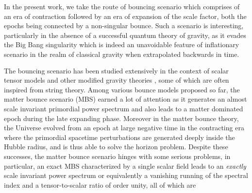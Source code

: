 \documentclass{article}
\begin{document}
In the present work, we take the route of bouncing scenario which comprises of an era of contraction 
followed by an era of expansion of the scale factor, both the epochs being connected by a non-singular bounce. Such a scenario is 
interesting, particularly in the absence of a successful quantum theory of gravity, as it evades the Big Bang singularity which is indeed an 
unavoidable feature of inflationary scenario in the realm of 
classical gravity when extrapolated backwards in time. 

The bouncing scenario has been studied extensively in the context of scalar tensor models and other modified gravity theories 
\cite{Brandenberger:2012zb,Brandenberger:2016vhg,Battefeld:2014uga,Novello:2008ra,Cai:2014bea,Cai:2016thi,
deHaro:2015wda,Lehners:2011kr,Lehners:2008vx,
Cai:2016hea,Colin:2017dwv,Cattoen:2005dx,Li:2014era,Brizuela:2009nk,Cai:2013kja,Quintin:2014oea,Cai:2013vm,pinto,
Koehn:2015vvy,Nojiri:2016ygo,Odintsov:2020zct,Koehn:2013upa,Battarra:2014kga,Martin:2001ue,Khoury:2001wf,
Hackworth:2004xb,Johnson:2011aa,Peter:2002cn,Gasperini:2003pb,Creminelli:2004jg,Lehners:2015mra,
Lehners:2013cka,Cai:2014xxa,Cai:2007qw,Barrow:2004ad,Haro:2015zda,Das:2017jrl,
Cai:2008qw,Finelli:2001sr,Cai:2011ci,Haro:2015zta,Cai:2011zx,Brandenberger:2009yt,deHaro:2014kxa,Odintsov:2014gea,
Qiu:2010ch,Bamba:2012ka,deHaro:2012xj,Nojiri:2019lqw,Elizalde:2019tee,Elizalde:2020zcb,WilsonEwing:2012pu}, 
some of which are often inspired 
from string theory. Among various bounce models proposed so far, the matter bounce scenario (MBS) 
\cite{deHaro:2015wda,Cai:2008qw,Finelli:2001sr,Quintin:2014oea,Cai:2011ci,
Haro:2015zta,Cai:2011zx,Cai:2013kja,Brandenberger:2009yt,deHaro:2014kxa,Odintsov:2014gea,
Qiu:2010ch,Bamba:2012ka,deHaro:2012xj,Nojiri:2019lqw,Elizalde:2019tee,Elizalde:2020zcb,
WilsonEwing:2012pu} earned a lot of attention as it 
generates an almost scale invariant primordial power spectrum and also leads to a matter dominated epoch during the late expanding phase. 
Moreover in the matter bounce theory, the Universe evolved from an epoch at large negative time in the contracting era 
where the primordial spacetime perturbations are generated deeply inside the Hubble radius, and is thus able to solve the horizon problem. 
Despite these successes, the matter bounce scenario hinges with some serious problems, in particular, an exact MBS characterized by a single scalar field 
leads to an \emph{exactly} scale invariant power spectrum or equivalently 
a vanishing running of the spectral index and a tensor-to-scalar ratio of order unity,  all of which are 
\end{document}
